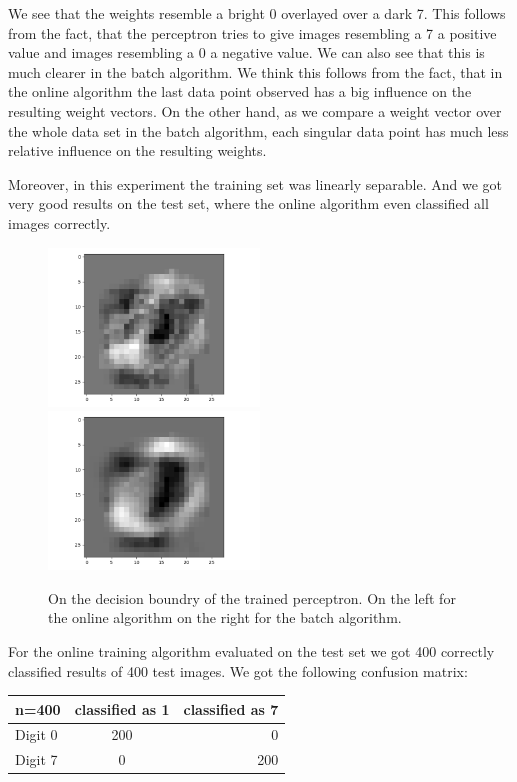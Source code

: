 We see that the weights resemble a bright 0 overlayed over a dark 7. This follows from the fact, that the perceptron tries to give images resembling a 7 a positive value and images resembling a 0 a negative value. We can also see that this is much clearer in the batch algorithm. We think this follows from the fact, that in the online algorithm the last data point observed has a big influence on the resulting weight vectors. On the other hand, as we compare a weight vector over the whole data set in the batch algorithm, each singular data point has much less relative influence on the resulting weights.

Moreover, in this experiment the training set was linearly separable. And we got very good results on the test set, where the online algorithm even classified all images correctly. 

\begin{figure}
\includegraphics[width = 0.5\textwidth]{figures/weights_image_online}
\includegraphics[width = 0.5\textwidth]{figures/weights_image_batch}
\caption{On the decision boundry of the trained perceptron. On the left for the online algorithm on the right for the batch algorithm.}
\label{perceptron:decision:5d}
\end{figure}

For the online training algorithm evaluated on the test set we got 400 correctly classified results of 400 test images. We got the following confusion matrix:

\begin{tabular}{ l | c | r }
\centering
  n=400 & classified as 1 & classified as 7 \\ \hline
  Digit 0 & 200 & 0 \\
  Digit 7 & 0 & 200 \\
\end{tabular}

